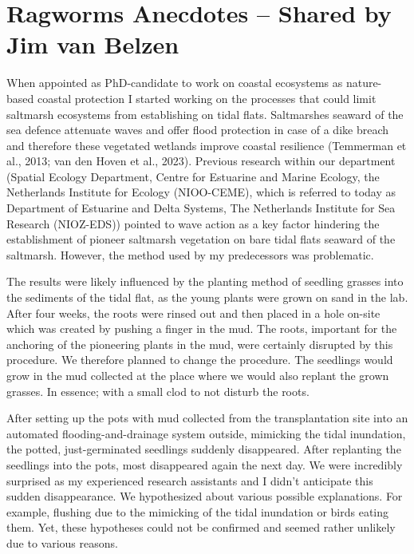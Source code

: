 \documentclass[authordate, empirical]{jote-new-article}
\author[1]{\mbox{Jim van Belzen\orcid{0000-0003-2099-1545}}}
\affil[1]{Wageningen Marine Research (WMR) \& Department of Estuarine and Delta Systems (EDS), Royal Netherlands Institute for Sea Research (NIOZ)}
\begin{document}
\begin{frontmatter}
  \maketitle
  \begin{abstract}
    \printabstracttext
  \end{abstract}
\end{frontmatter}


	\section{Ragworms Anecdotes -- Shared by Jim van Belzen}



	When appointed as PhD-candidate to work on coastal ecosystems as nature-based coastal protection I started working on the processes that could limit saltmarsh ecosystems from establishing on tidal flats. Saltmarshes seaward of the sea defence attenuate waves and offer flood protection in case of a dike breach and therefore these vegetated wetlands improve coastal resilience (Temmerman et al., 2013; van den Hoven et al., 2023). Previous research within our department (Spatial Ecology Department, Centre for Estuarine and Marine Ecology, the Netherlands Institute for Ecology (NIOO-CEME), which is referred to today as Department of Estuarine and Delta Systems, The Netherlands Institute for Sea Research (NIOZ-EDS)) pointed to wave action as a key factor hindering the establishment of pioneer saltmarsh vegetation on bare tidal flats seaward of the saltmarsh. However, the method used by my predecessors was problematic.



	The results were likely influenced by the planting method of seedling grasses into the sediments of the tidal flat, as the young plants were grown on sand in the lab. After four weeks, the roots were rinsed out and then placed in a hole on-site which was created by pushing a finger in the mud. The roots, important for the anchoring of the pioneering plants in the mud, were certainly disrupted by this procedure. We therefore planned to change the procedure. The seedlings would grow in the mud collected at the place where we would also replant the grown grasses. In essence; with a small clod to not disturb the roots.



	After setting up the pots with mud collected from the transplantation site into an automated flooding-and-drainage system outside, mimicking the tidal inundation, the potted, just-germinated seedlings suddenly disappeared. After replanting the seedlings into the pots, most disappeared again the next day. We were incredibly surprised as my experienced research assistants and I didn't anticipate this sudden disappearance. We hypothesized about various possible explanations. For example, flushing due to the mimicking of the tidal inundation or birds eating them. Yet, these hypotheses could not be confirmed and seemed rather unlikely due to various reasons.
\end{document}
